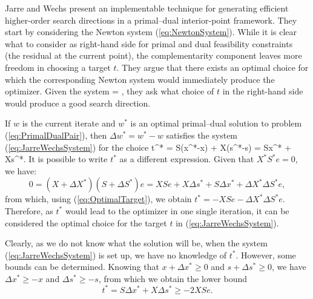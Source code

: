 Jarre and Wechs \cite{JarreWechs} %
present an implementable technique for generating efficient 
higher-order search directions in a primal--dual interior-point framework.
They start by considering the Newton system (\ref{eq:NewtonSystem}).
While it is clear what to consider as right-hand 
side for primal and dual feasibility constraints (the residual 
at the current point), the complementarity component leaves more 
freedom in choosing a target $t$. They argue that there exists 
an optimal choice for which the corresponding Newton system would 
immediately produce the optimizer.
Given the system
\be
\label{eq:JarreWechsSystem}
 =
\left[ \begin{array}{c}
    b-Ax \\ c-A^Ty-s \\ t
  \end{array} \right],
\ee
they ask what choice of $t$ in the right-hand side 
would produce a good search direction.

If $w$ is the current iterate and 
$w^*$ is an optimal primal--dual solution to 
problem (\ref{eq:PrimalDualPair}), then 
$\Delta w^*= w^*-w$ satisfies the 
system (\ref{eq:JarreWechsSystem}) for the choice
\be  \label{eq:OptimalTarget}
  t^* = S(x^*-x) + X(s^*-s) = S\Delta x^* + X\Delta s^*.
\ee
It is possible to write $t^*$ as a different expression. 
Given that $X^*S^*e=0$, we have:
\[
  0 = (X+\Delta X^*)(S+\Delta S^*)e 
    = XSe + X\Delta s^* +S\Delta x^* +\Delta X^*\Delta S^*e,
\]
from which, using (\ref{eq:OptimalTarget}), we obtain
$t^* = -XSe - \Delta X^* \Delta S^*e$.
Therefore, as $t^*$ would lead to the optimizer in one single iteration,
it can be considered the optimal choice for the target $t$
in (\ref{eq:JarreWechsSystem}).

Clearly, as we do not know what the solution will be,
when the system (\ref{eq:JarreWechsSystem}) is set up, 
we have no knowledge of $t^*$. 
However, some bounds can be determined. Knowing that 
$x+\Delta x^* \ge 0$ and $s+\Delta s^* \ge 0$, we have 
$\Delta x^* \ge -x$ and $\Delta s^* \ge -s$, from which we obtain
the lower bound
\[
  t^*= S\Delta x^* + X\Delta s^* \ge -2XSe.
\]

